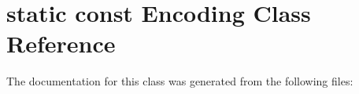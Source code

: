 \hypertarget{classstatic_01const_01Encoding}{}\section{static const Encoding Class Reference}
\label{classstatic_01const_01Encoding}


The documentation for this class was generated from the following files\+:
